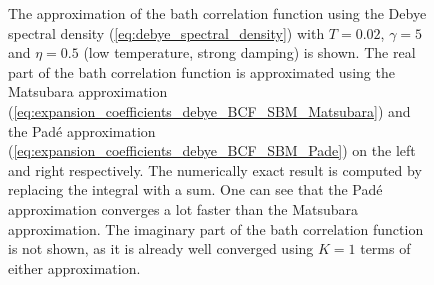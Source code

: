 \begin{figure}[!ht]
\begin{subfigure}[b]{0.471\textwidth}
        \caption{}
        \label{fig:low_T_BCF_convergence_pade}
    \end{subfigure}
    \caption{The approximation of the bath correlation function using the Debye spectral density (\ref{eq:debye_spectral_density}) 
    with $T = 0.02$, $\gamma = 5$ and $\eta = 0.5$ (low temperature, strong damping) is shown. The real part of
    the bath correlation function is approximated using the Matsubara approximation (\ref{eq:expansion_coefficients_debye_BCF_SBM_Matsubara}) and the
    Padé approximation (\ref{eq:expansion_coefficients_debye_BCF_SBM_Pade}) on the left and right respectively. The numerically exact
    result is computed by replacing the integral with a sum. One can see that the Padé approximation converges a lot faster than the Matsubara approximation.
    The imaginary part of the bath correlation function is not shown, as it is already well converged using $K=1$ terms of either approximation.}
    \label{fig:low_T_BCF_convergence} 
\end{figure}